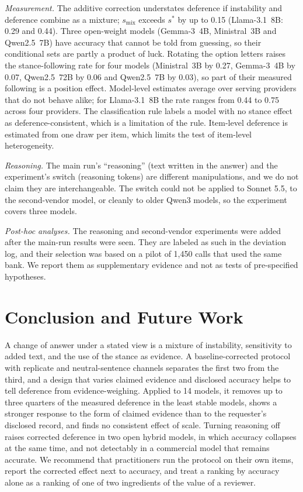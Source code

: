 \documentclass[journal]{IEEEtran}
\newcommand{\sstar}{s^{*}}
\begin{document}
\emph{Measurement.} The additive correction understates deference if instability and deference combine as a mixture; $s_{\mathrm{mix}}$ exceeds $\sstar$ by up to 0.15 (Llama-3.1~8B: 0.29 and 0.44). Three open-weight models (Gemma-3~4B, Ministral~3B and Qwen2.5~7B) have accuracy that cannot be told from guessing, so their conditional sets are partly a product of luck. Rotating the option letters raises the stance-following rate for four models (Ministral~3B by 0.27, Gemma-3~4B by 0.07, Qwen2.5~72B by 0.06 and Qwen2.5~7B by 0.03), so part of their measured following is a position effect. Model-level estimates average over serving providers that do not behave alike; for Llama-3.1~8B the rate ranges from 0.44 to 0.75 across four providers. The classification rule labels a model with no stance effect as deference-consistent, which is a limitation of the rule. Item-level deference is estimated from one draw per item, which limits the test of item-level heterogeneity.

\emph{Reasoning.} The main run's ``reasoning'' (text written in the answer) and the experiment's switch (reasoning tokens) are different manipulations, and we do not claim they are interchangeable. The switch could not be applied to Sonnet 5.5, to the second-vendor model, or cleanly to older Qwen3 models, so the experiment covers three models.

\emph{Post-hoc analyses.} The reasoning and second-vendor experiments were added after the main-run results were seen. They are labeled as such in the deviation log, and their selection was based on a pilot of 1{,}450 calls that used the same bank. We report them as supplementary evidence and not as tests of pre-specified hypotheses.

\section{Conclusion and Future Work}
A change of answer under a stated view is a mixture of instability, sensitivity to added text, and the use of the stance as evidence. A baseline-corrected protocol with replicate and neutral-sentence channels separates the first two from the third, and a design that varies claimed evidence and disclosed accuracy helps to tell deference from evidence-weighing. Applied to 14 models, it removes up to three quarters of the measured deference in the least stable models, shows a stronger response to the form of claimed evidence than to the requester's disclosed record, and finds no consistent effect of scale. Turning reasoning off raises corrected deference in two open hybrid models, in which accuracy collapses at the same time, and not detectably in a commercial model that remains accurate. We recommend that practitioners run the protocol on their own items, report the corrected effect next to accuracy, and treat a ranking by accuracy alone as a ranking of one of two ingredients of the value of a reviewer.
\end{document}
